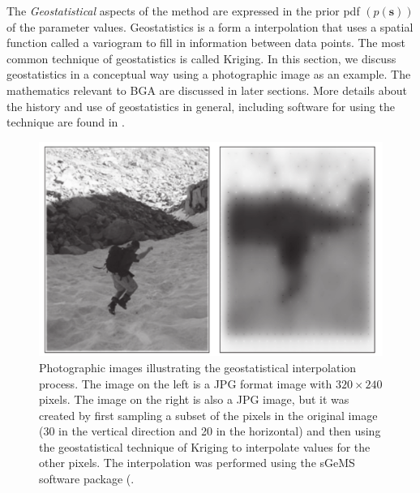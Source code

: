 \documentclass[11pt,oneside,onecolumn]{usgsreport}
\begin{document}
\begin{multicols}{2}
The \emph{Geostatistical }aspects of the method are expressed in the
prior pdf $\left(p\left(\mathbf{s}\right)\right)$ of the parameter
values. Geostatistics is a form a interpolation that uses a spatial
function called a variogram to fill in information between data points.
The most common technique of geostatistics is called Kriging. In this
section, we discuss geostatistics in a conceptual way using a photographic
image as an example. The mathematics relevant to BGA are discussed
in later sections. More details about the history and use of geostatistics
in general, including software for using the technique are found in
\citet{Isaaks1989,DeutschJourneal1992,Kitanidis1997,sgems}.

\begin{figure}[!t]
\begin{center}\includegraphics[scale=0.6]{figures/Kriging_image}\end{center}

\caption{\label{fig:mikephoto}Photographic images illustrating the geostatistical
interpolation process. The image on the left is a JPG format image
with $320\times240$ pixels. The image on the right is also a JPG
image, but it was created by first sampling a subset of the pixels
in the original image (30 in the vertical direction and 20 in the
horizontal) and then using the geostatistical technique of Kriging
to interpolate values for the other pixels. The interpolation was
performed using the sGeMS software package (\citet{sgems}.}
\end{figure}



\end{multicols}
\end{document}
